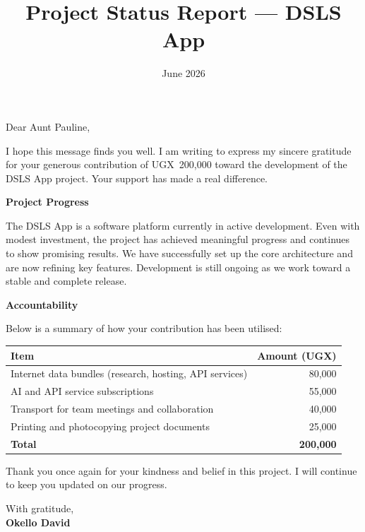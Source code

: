 \documentclass[11pt]{article}
\title{\textbf{Project Status Report --- DSLS App}}
\date{June 2026}
\begin{document}
\maketitle

\vspace{0.5cm}

Dear Aunt Pauline,

I hope this message finds you well. I am writing to express my sincere gratitude
for your generous contribution of UGX~200,000 toward the development of the
DSLS App project. Your support has made a real difference.

\vspace{0.3cm}

\noindent\textbf{Project Progress}

The DSLS App is a software platform currently in active development. Even with
modest investment, the project has achieved meaningful progress and continues to
show promising results. We have successfully set up the core architecture and are
now refining key features. Development is still ongoing as we work toward a
stable and complete release.

\vspace{0.3cm}

\noindent\textbf{Accountability}

Below is a summary of how your contribution has been utilised:

\vspace{0.3cm}

\begin{center}
\begin{tabular}{lr}
\toprule
\textbf{Item} & \textbf{Amount (UGX)} \\
\midrule
Internet data bundles (research, hosting, API services) & 80,000 \\
AI and API service subscriptions & 55,000 \\
Transport for team meetings and collaboration & 40,000 \\
Printing and photocopying project documents & 25,000 \\
\midrule
\textbf{Total} & \textbf{200,000} \\
\bottomrule
\end{tabular}
\end{center}

\vspace{0.3cm}

Thank you once again for your kindness and belief in this project. I will
continue to keep you updated on our progress.

\vspace{0.5cm}

With gratitude,\\
\textbf{Okello David}
\end{document}
